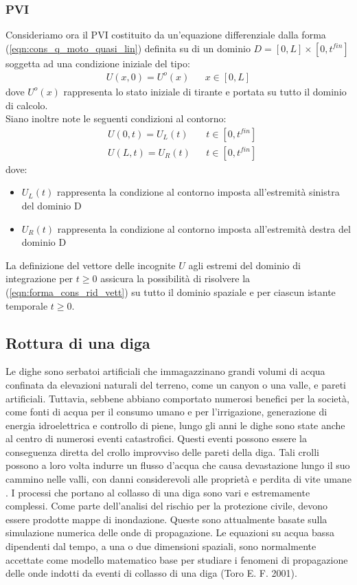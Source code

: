 \documentclass[12pt]{article} %
\begin{document}
\subsubsection{PVI}
\noindent Consideriamo ora il PVI costituito da un'equazione differenziale dalla forma (\ref{eqn:cons_q_moto_quasi_lin}) definita su di un dominio $D=[0,L]\times[0,t^{fin}]$ soggetta ad una condizione iniziale del tipo:
\begin{align}
    U(x,0) = U^o(x) && x \in [0,L]
\end{align}
\noindent dove $U^o(x)$ rappresenta lo stato iniziale di tirante e portata su tutto il dominio di calcolo.\\
\noindent Siano inoltre note le seguenti condizioni al contorno:
\begin{align}
    &U(0,t) = U_L(t) && t \in [0,t^{fin}]\\
    &U(L,t) = U_R(t) && t \in [0,t^{fin}]
\end{align}
\noindent dove:
\begin{itemize}
    \item $U_L(t)$ rappresenta la condizione al contorno imposta all'estremità sinistra del dominio D
    \item $U_R(t)$ rappresenta la condizione al contorno imposta all'estremità destra del dominio D
\end{itemize}
\noindent La definizione del vettore delle incognite $U$ agli estremi del dominio di integrazione per $t \geq 0$ assicura la possibilità di risolvere la (\ref{eqn:forma_cons_rid_vett}) su tutto il dominio spaziale e per ciascun istante temporale $t \geq 0$.

\subsection{Rottura di una diga}
\noindent Le dighe sono serbatoi artificiali che immagazzinano grandi volumi di acqua confinata da elevazioni naturali del terreno, come un canyon o una valle, e pareti artificiali. Tuttavia, sebbene abbiano comportato numerosi benefici per la società, come fonti di acqua per il consumo umano e per l'irrigazione, generazione di energia idroelettrica e controllo di piene, lungo gli anni le dighe sono state anche al centro di numerosi eventi catastrofici. Questi eventi possono essere la conseguenza diretta del crollo improvviso delle pareti della diga. Tali crolli possono a loro volta indurre un flusso d'acqua che causa devastazione lungo il suo cammino nelle valli, con danni considerevoli alle proprietà e perdita di vite umane . I processi che portano al collasso di una diga sono vari e estremamente complessi. Come parte dell'analisi del rischio per la protezione civile, devono essere prodotte mappe di inondazione. Queste sono attualmente basate sulla simulazione numerica delle onde di propagazione. Le equazioni su acqua bassa dipendenti dal tempo, a una o due dimensioni spaziali, sono normalmente accettate come modello matematico base per studiare i fenomeni di propagazione delle onde indotti da eventi di collasso di una diga (Toro E. F. 2001).
\end{document}

